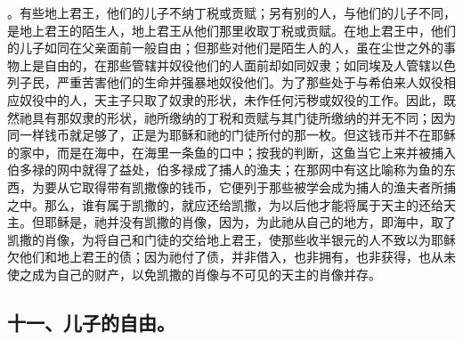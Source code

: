 。有些地上君王，他们的儿子不纳丁税或贡赋；另有别的人，与他们的儿子不同，是地上君王的陌生人，地上君王从他们那里收取丁税或贡赋。在地上君王中，他们的儿子如同在父亲面前一般自由；但那些对他们是陌生人的人，虽在尘世之外的事物上是自由的，在那些管辖并奴役他们的人面前却如同奴隶；如同埃及人管辖以色列子民，严重苦害他们的生命并强暴地奴役他们。为了那些处于与希伯来人奴役相应奴役中的人，天主子只取了奴隶的形状，未作任何污秽或奴役的工作。因此，既然祂具有那奴隶的形状，祂所缴纳的丁税和贡赋与其门徒所缴纳的并无不同；因为同一样钱币就足够了，正是为耶稣和祂的门徒所付的那一枚。但这钱币并不在耶稣的家中，而是在海中，在海里一条鱼的口中；按我的判断，这鱼当它上来并被捕入伯多禄的网中就得了益处，伯多禄成了捕人的渔夫；在那网中有这比喻称为鱼的东西，为要从它取得带有凯撒像的钱币，它便列于那些被学会成为捕人的渔夫者所捕之中。那么，谁有属于凯撒的，就应还给凯撒，为以后他才能将属于天主的还给天主。但耶稣是，祂并没有凯撒的肖像，因为，为此祂从自己的地方，即海中，取了凯撒的肖像，为将自己和门徒的交给地上君王，使那些收半银元的人不致以为耶稣欠他们和地上君王的债；因为祂付了债，并非借入，也非拥有，也非获得，也从未使之成为自己的财产，以免凯撒的肖像与不可见的天主的肖像并存。\par


\subsection{十一、儿子的自由。}

